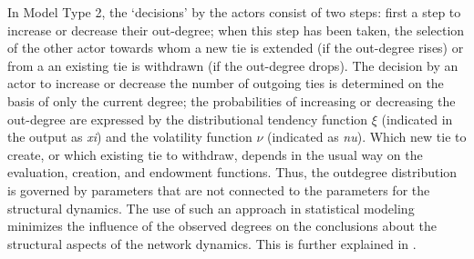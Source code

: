 \documentclass[a4paper,fleqn,11pt]{article}
\newcommand{\+}{\, + \,}
\newcommand{\SI}{{\sf SIENA }}
\newcommand{\si}{{\sf SIENA}}
\newcommand{\saom}{{Stochastic Actor-Oriented Model}}
\begin{document}

\iffalse
In Model Type 2, the `decisions' by the actors
consist of two steps: first a step to increase or decrease their
out-degree; when this step has been taken, the selection of the
other actor towards whom a new tie is extended (if the out-degree
rises) or from a an existing tie is withdrawn (if the out-degree
drops).
The decision by an actor to increase or decrease the number of outgoing ties
is determined on the basis
of only the current degree; the probabilities of increasing or
decreasing the out-degree are expressed by the distributional
tendency function $\xi$ (indicated in the output as \emph{xi}) and
the volatility function $\nu$ (indicated as \emph{nu}). Which new
tie to create, or which existing tie to withdraw, depends in the
usual way on the evaluation, creation, and endowment functions. Thus, the
outdegree distribution is governed by parameters that are not
connected to the parameters for the structural dynamics. The use of
such an approach in statistical modeling minimizes the influence of
the observed degrees on the conclusions about the structural aspects
of the network dynamics. This is further explained in \citet{Snijders03}.
\end{document}
